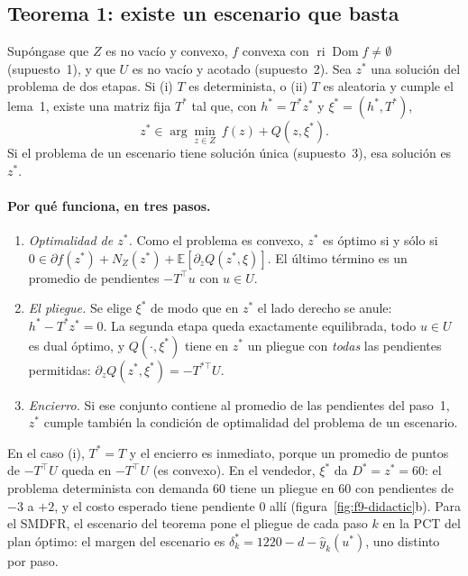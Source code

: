 \subsection{Teorema 1: existe un escenario que basta}\label{sec:rozas-teorema}
\begin{proposicion}\label{prop:homem}
Supóngase que $Z$ es no vacío y convexo, $f$ convexa con $\operatorname{ri}\operatorname{Dom}f
\neq\emptyset$ (supuesto~1), y que $U$ es no vacío y acotado (supuesto~2). Sea $z^*$ una solución
del problema de dos etapas. Si (i) $T$ es determinista, o (ii) $T$ es aleatoria y cumple el
lema~1, existe una matriz fija $T^*$ tal que, con $h^*=T^*z^*$ y $\xi^*=(h^*,T^*)$,
\[
z^*\in\arg\min_{z\in Z}\ f(z)+Q(z,\xi^*).
\]
Si el problema de un escenario tiene solución única (supuesto~3), esa solución es $z^*$.
\end{proposicion}

\paragraph{Por qué funciona, en tres pasos.}
\begin{enumerate}
  \item \emph{Optimalidad de $z^*$.} Como el problema es convexo, $z^*$ es óptimo si y sólo si
        $0\in\partial f(z^*)+N_Z(z^*)+\mathbb E[\partial_zQ(z^*,\xi)]$. El último término es un
        promedio de pendientes $-T^\top u$ con $u\in U$.
  \item \emph{El pliegue.} Se elige $\xi^*$ de modo que en $z^*$ el lado derecho se anule:
        $h^*-T^*z^*=0$. La segunda etapa queda exactamente equilibrada, todo $u\in U$ es dual
        óptimo, y $Q(\cdot,\xi^*)$ tiene en $z^*$ un pliegue con \emph{todas} las pendientes
        permitidas: $\partial_zQ(z^*,\xi^*)=-T^{*\top}U$.
  \item \emph{Encierro.} Si ese conjunto contiene al promedio de las pendientes del paso~1,
        $z^*$ cumple también la condición de optimalidad del problema de un escenario.
\end{enumerate}
En el caso (i), $T^*=T$ y el encierro es inmediato, porque un promedio de puntos de $-T^\top U$
queda en $-T^\top U$ (es convexo). En el vendedor, $\xi^*$ da $D^*=z^*=60$: el problema
determinista con demanda 60 tiene un pliegue en 60 con pendientes de $-3$ a $+2$, y el costo
esperado tiene pendiente 0 allí (figura~\ref{fig:f9-didactic}b). Para el SMDFR, el escenario del
teorema pone el pliegue de cada paso $k$ en la PCT del plan óptimo: el margen del escenario es
$\delta^*_k=1220-d-\hat y_k(u^*)$, uno distinto por paso.

